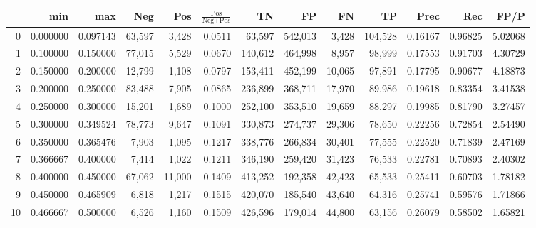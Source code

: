 \begin{tabular}{rrrrrrrrrrrrr}
\toprule
{} &       min &       max &     Neg &     Pos & $\frac{\text{Pos}}{\text{Neg}+\text{Pos}}$ &       TN &       FP &       FN &       TP &     Prec &      Rec &     FP/P \\
\midrule
0  &  0.000000 &  0.097143 &  63,597 &   3,428 &                                     0.0511 &   63,597 &  542,013 &    3,428 &  104,528 &  0.16167 &  0.96825 &  5.02068 \\
1  &  0.100000 &  0.150000 &  77,015 &   5,529 &                                     0.0670 &  140,612 &  464,998 &    8,957 &   98,999 &  0.17553 &  0.91703 &  4.30729 \\
2  &  0.150000 &  0.200000 &  12,799 &   1,108 &                                     0.0797 &  153,411 &  452,199 &   10,065 &   97,891 &  0.17795 &  0.90677 &  4.18873 \\
3  &  0.200000 &  0.250000 &  83,488 &   7,905 &                                     0.0865 &  236,899 &  368,711 &   17,970 &   89,986 &  0.19618 &  0.83354 &  3.41538 \\
4  &  0.250000 &  0.300000 &  15,201 &   1,689 &                                     0.1000 &  252,100 &  353,510 &   19,659 &   88,297 &  0.19985 &  0.81790 &  3.27457 \\
5  &  0.300000 &  0.349524 &  78,773 &   9,647 &                                     0.1091 &  330,873 &  274,737 &   29,306 &   78,650 &  0.22256 &  0.72854 &  2.54490 \\
6  &  0.350000 &  0.365476 &   7,903 &   1,095 &                                     0.1217 &  338,776 &  266,834 &   30,401 &   77,555 &  0.22520 &  0.71839 &  2.47169 \\
7  &  0.366667 &  0.400000 &   7,414 &   1,022 &                                     0.1211 &  346,190 &  259,420 &   31,423 &   76,533 &  0.22781 &  0.70893 &  2.40302 \\
8  &  0.400000 &  0.450000 &  67,062 &  11,000 &                                     0.1409 &  413,252 &  192,358 &   42,423 &   65,533 &  0.25411 &  0.60703 &  1.78182 \\
9  &  0.450000 &  0.465909 &   6,818 &   1,217 &                                     0.1515 &  420,070 &  185,540 &   43,640 &   64,316 &  0.25741 &  0.59576 &  1.71866 \\
10 &  0.466667 &  0.500000 &   6,526 &   1,160 &                                     0.1509 &  426,596 &  179,014 &   44,800 &   63,156 &  0.26079 &  0.58502 &  1.65821 \\

\end{tabular}
